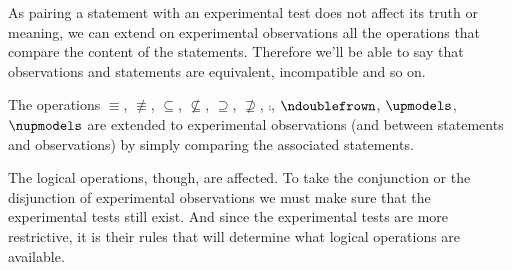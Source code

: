 \documentclass[11pt,letterpaper,fleqn]{memoir} %
\begin{document}
As pairing a statement with an experimental test does not affect its truth or meaning, we can extend on experimental observations all the operations that compare the content of the statements. Therefore we'll be able to say that observations and statements are equivalent, incompatible and so on.

\begin{mathSection}
\begin{defn}
	The operations $\equiv$, $\nequiv$, $\subseteq$, $\nsubseteq$, $\supseteq$, $\nsupseteq$, $\comp$, $\ncomp$, $\indep$, $\nindep$ are extended to experimental observations (and between statements and observations) by simply comparing the associated statements.
\end{defn}
\end{mathSection}

The logical operations, though, are affected. To take the conjunction or the disjunction of experimental observations we must make sure that the experimental tests still exist. And since the experimental tests are more restrictive, it is their rules that will determine what logical operations are available.
\end{document}
